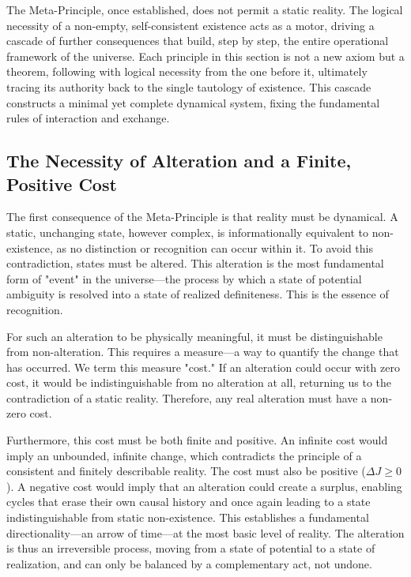 \documentclass[11pt,a4paper]{article}
\begin{document}
The Meta-Principle, once established, does not permit a static reality. The logical necessity of a non-empty, self-consistent existence acts as a motor, driving a cascade of further consequences that build, step by step, the entire operational framework of the universe. Each principle in this section is not a new axiom but a theorem, following with logical necessity from the one before it, ultimately tracing its authority back to the single tautology of existence. This cascade constructs a minimal yet complete dynamical system, fixing the fundamental rules of interaction and exchange.

\subsection{The Necessity of Alteration and a Finite, Positive Cost}
The first consequence of the Meta-Principle is that reality must be dynamical. A static, unchanging state, however complex, is informationally equivalent to non-existence, as no distinction or recognition can occur within it. To avoid this contradiction, states must be altered. This alteration is the most fundamental form of "event" in the universe—the process by which a state of potential ambiguity is resolved into a state of realized definiteness. This is the essence of recognition.

For such an alteration to be physically meaningful, it must be distinguishable from non-alteration. This requires a measure—a way to quantify the change that has occurred. We term this measure "cost." If an alteration could occur with zero cost, it would be indistinguishable from no alteration at all, returning us to the contradiction of a static reality. Therefore, any real alteration must have a non-zero cost.

Furthermore, this cost must be both finite and positive. An infinite cost would imply an unbounded, infinite change, which contradicts the principle of a consistent and finitely describable reality. The cost must also be positive (\(\Delta J \ge 0\)). A negative cost would imply that an alteration could create a surplus, enabling cycles that erase their own causal history and once again leading to a state indistinguishable from static non-existence. This establishes a fundamental directionality—an arrow of time—at the most basic level of reality. The alteration is thus an irreversible process, moving from a state of potential to a state of realization, and can only be balanced by a complementary act, not undone.
\end{document}
